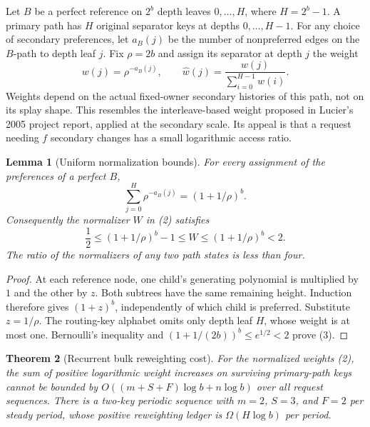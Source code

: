 \documentclass[11pt]{article}
\newtheorem{theorem}{Theorem}
\newtheorem{lemma}[theorem]{Lemma}
\begin{document}
Let $B$ be a perfect reference on $2^b$ depth leaves
$0,\ldots,H$, where $H=2^b-1$. A primary path has $H$ original
separator keys at depths $0,\ldots,H-1$. For any choice of secondary
preferences, let $a_B(j)$ be the number of nonpreferred edges on the
$B$-path to depth leaf $j$. Fix $\rho=2b$ and assign its separator
at depth $j$ the weight
\[
 w(j)=\rho^{-a_B(j)},\qquad
 \widehat w(j)=\frac{w(j)}{\sum_{i=0}^{H-1}w(i)}.
                                                        \tag{2}
\]
Weights depend on the actual fixed-owner secondary histories of this
path, not on its splay shape. This resembles the interleave-based
weight proposed in Lucier's 2005 project report, applied at the
secondary scale. Its appeal is that a request needing $f$ secondary
changes has a small logarithmic access ratio.

\begin{lemma}[Uniform normalization bounds]\label{lem:norm}
For every assignment of the preferences of a perfect $B$,
\[
 \sum_{j=0}^{H}\rho^{-a_B(j)}=(1+1/\rho)^b.
\]
Consequently the normalizer $W$ in (2) satisfies
\[
 \frac12\le (1+1/\rho)^b-1\le W
       \le(1+1/\rho)^b<2.
                                                        \tag{3}
\]
The ratio of the normalizers of any two path states is less than four.
\end{lemma}

\begin{proof}
At each reference node, one child's generating polynomial is multiplied
by $1$ and the other by $z$. Both subtrees have the same remaining
height. Induction therefore gives $(1+z)^b$, independently of which
child is preferred. Substitute $z=1/\rho$. The routing-key alphabet
omits only depth leaf $H$, whose weight is at most one. Bernoulli's
inequality and $(1+1/(2b))^b\le e^{1/2}<2$ prove (3).
\end{proof}

\begin{theorem}[Recurrent bulk reweighting cost]\label{thm:bulk}
For the normalized weights (2), the sum of positive logarithmic
weight increases on surviving primary-path keys cannot be bounded by
$O((m+S+F)\log b+n\log b)$ over all request sequences.
There is a two-key periodic sequence with $m=2$, $S=3$, and $F=2$
per steady period, whose positive reweighting ledger is
$\Omega(H\log b)$ per period.
\end{theorem}
\end{document}
